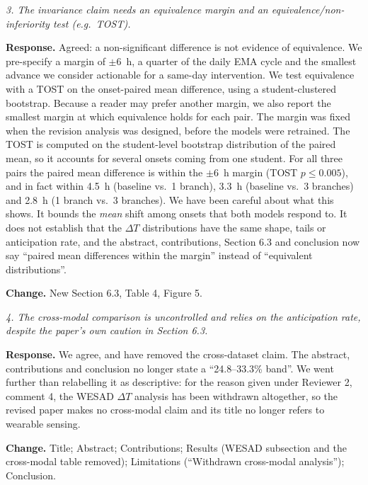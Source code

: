 \documentclass[11pt]{article}
\newenvironment{comment}{\par\medskip\noindent\begin{minipage}{\linewidth}\itshape\color{black!70}}{\end{minipage}\par\smallskip}
\newcommand{\dt}{$\Delta T$}
\newcommand{\resp}{\noindent\textbf{Response.} }
\newcommand{\change}{\par\noindent\textbf{Change.} }
\begin{document}
\begin{comment}3. The invariance claim needs an equivalence margin and an
equivalence/non-inferiority test (e.g.\ TOST).\end{comment}
\resp Agreed: a non-significant difference is not evidence of
equivalence. We pre-specify a margin of $\pm 6$~h, a quarter of the
daily EMA cycle and the smallest advance we consider actionable for a
same-day intervention. We test equivalence with a TOST on the
onset-paired mean difference, using a student-clustered bootstrap.
Because a reader may prefer another margin, we also report the smallest
margin at which equivalence holds for each pair. The margin was fixed
when the revision analysis was designed, before the models were
retrained. The TOST is computed on the student-level bootstrap
distribution of the paired mean, so it accounts for several onsets
coming from one student. For all three pairs the paired mean difference
is within the $\pm 6$~h margin (TOST $p \leq 0.005$), and in fact
within 4.5~h (baseline vs.\ 1 branch), 3.3~h (baseline vs.\ 3 branches)
and 2.8~h (1 branch vs.\ 3 branches). We have been careful about what
this shows. It bounds the \emph{mean} shift among onsets that both
models respond to. It does not establish that the \dt{} distributions
have the same shape, tails or anticipation rate, and the abstract,
contributions, Section 6.3 and conclusion now say ``paired mean
differences within the margin'' instead of ``equivalent distributions''.
\change New Section 6.3, Table 4, Figure 5.

\begin{comment}4. The cross-modal comparison is uncontrolled and relies on
the anticipation rate, despite the paper's own caution in Section 6.3.\end{comment}
\resp We agree, and have removed the cross-dataset claim. The abstract,
contributions and conclusion no longer state a ``24.8--33.3\% band''.
We went further than relabelling it as descriptive: for the reason
given under Reviewer 2, comment 4, the WESAD \dt{} analysis has been
withdrawn altogether, so the revised paper makes no cross-modal claim
and its title no longer refers to wearable sensing.
\change Title; Abstract; Contributions; Results (WESAD subsection and
the cross-modal table removed); Limitations (``Withdrawn cross-modal
analysis''); Conclusion.
\end{document}
